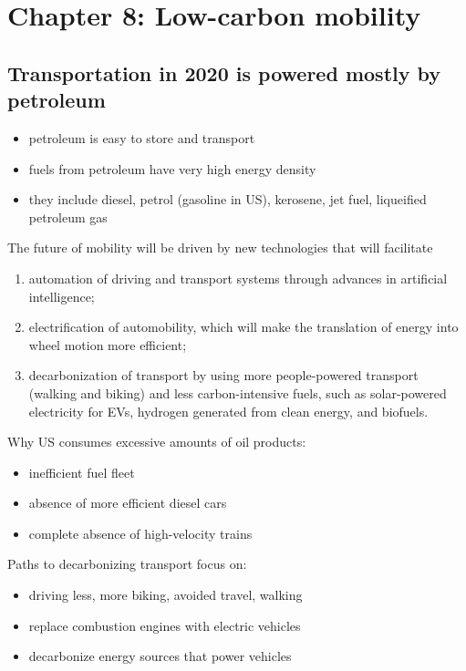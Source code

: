 \section{Chapter 8: Low-carbon mobility}

\subsection{Transportation in 2020 is powered mostly by petroleum}

\begin{itemize}
	\item petroleum is easy to store and transport
	\item fuels from petroleum have very high energy density
	\item they include diesel, petrol (gasoline in US), kerosene, jet fuel,
	liqueified petroleum gas
\end{itemize}

The future of mobility will be driven by new technologies that will facilitate
\begin{enumerate}
	\item automation of driving and transport systems through advances in
	artificial intelligence;
	\item electrification of automobility, which will make the translation
	of energy into wheel motion more efficient;
	\item decarbonization of transport by using more people-powered
	transport (walking and biking) and less carbon-intensive fuels, such
	as solar-powered electricity for EVs, hydrogen generated from clean
	energy, and biofuels.
\end{enumerate}

Why US consumes excessive amounts of oil products:
\begin{itemize}
	\item inefficient fuel fleet
	\item absence of more efficient diesel cars
	\item complete absence of high-velocity trains
\end{itemize}

Paths to decarbonizing transport focus on:

\begin{itemize}
	\item driving less, more biking, avoided travel, walking
	\item replace combustion engines with electric vehicles
	\item decarbonize energy sources that power vehicles
\end{itemize}

